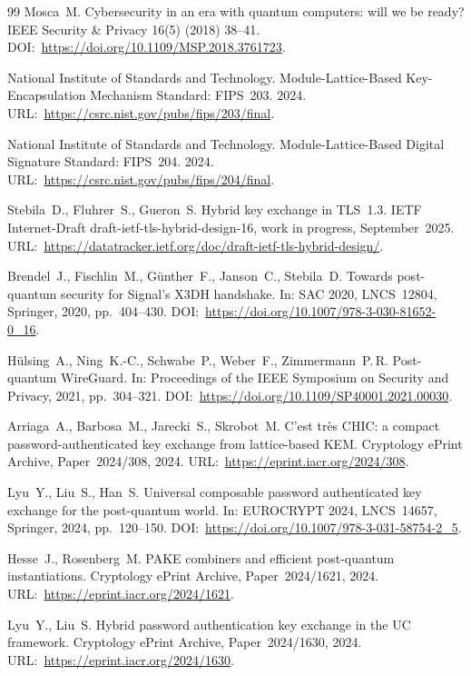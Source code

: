 \documentclass[preprint,12pt]{elsarticle}
\theoremstyle{remark}
\begin{document}
\begin{thebibliography}{99}
Mosca~M.
Cybersecurity in an era with quantum computers: will we be ready?
IEEE Security \& Privacy 16(5) (2018) 38--41.
DOI:~\url{https://doi.org/10.1109/MSP.2018.3761723}.

National Institute of Standards and Technology.
Module-Lattice-Based Key-Encapsulation Mechanism Standard: FIPS~203.
2024.
URL:~\url{https://csrc.nist.gov/pubs/fips/203/final}.

National Institute of Standards and Technology.
Module-Lattice-Based Digital Signature Standard: FIPS~204.
2024.
URL:~\url{https://csrc.nist.gov/pubs/fips/204/final}.

Stebila~D., Fluhrer~S., Gueron~S.
Hybrid key exchange in TLS~1.3.
IETF Internet-Draft draft-ietf-tls-hybrid-design-16, work in progress, September~2025.
URL:~\url{https://datatracker.ietf.org/doc/draft-ietf-tls-hybrid-design/}.

Brendel~J., Fischlin~M., G\"{u}nther~F., Janson~C., Stebila~D.
Towards post-quantum security for Signal's X3DH handshake.
In: SAC 2020, LNCS~12804, Springer, 2020, pp.~404--430.
DOI:~\url{https://doi.org/10.1007/978-3-030-81652-0_16}.

H\"{u}lsing~A., Ning~K.-C., Schwabe~P., Weber~F., Zimmermann~P.\,R.
Post-quantum WireGuard.
In: Proceedings of the IEEE Symposium on Security and Privacy, 2021, pp.~304--321.
DOI:~\url{https://doi.org/10.1109/SP40001.2021.00030}.

Arriaga~A., Barbosa~M., Jarecki~S., Skrobot~M.
C'est tr\`es CHIC: a compact password-authenticated key exchange from lattice-based KEM.
Cryptology ePrint Archive, Paper~2024/308, 2024.
URL:~\url{https://eprint.iacr.org/2024/308}.

Lyu~Y., Liu~S., Han~S.
Universal composable password authenticated key exchange for the post-quantum world.
In: EUROCRYPT 2024, LNCS~14657, Springer, 2024, pp.~120--150.
DOI:~\url{https://doi.org/10.1007/978-3-031-58754-2_5}.

Hesse~J., Rosenberg~M.
PAKE combiners and efficient post-quantum instantiations.
Cryptology ePrint Archive, Paper~2024/1621, 2024.
URL:~\url{https://eprint.iacr.org/2024/1621}.

Lyu~Y., Liu~S.
Hybrid password authentication key exchange in the UC framework.
Cryptology ePrint Archive, Paper~2024/1630, 2024.
URL:~\url{https://eprint.iacr.org/2024/1630}.


\end{thebibliography}
\end{document}
